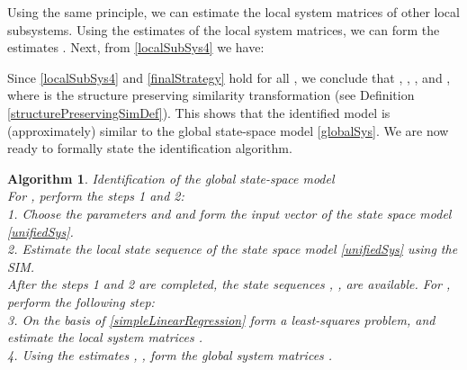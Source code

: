 \documentclass[journal,10pt]{IEEEtran}
\newtheorem{algorithm}[thm]{Algorithm}
\begin{document}
\begin{small}

\end{small}
Using the same principle, we can estimate the local system matrices of other local subsystems. Using the estimates of the local system matrices, we can form the estimates . Next, from \eqref{localSubSys4} we have:
\begin{small}

\end{small}
Since \eqref{localSubSys4} and \eqref{finalStrategy} hold for all , we conclude that , , , and ,
where  is the structure preserving similarity transformation (see Definition \ref{structurePreservingSimDef}). This shows that the identified model is (approximately) similar to the global state-space model \eqref{globalSys}. We are now ready to formally state the identification algorithm.
\\
\begin{algorithm} \textit{Identification of the global state-space model}\\
For , perform the steps 1 and 2: \\ 
1. Choose the parameters  and  and form the input vector   of the state space model \eqref{unifiedSys}.\\
 2. Estimate the local state sequence  of the state space model \eqref{unifiedSys} using the SIM.\\
After the steps 1 and 2 are completed, the state sequences , , are available. For , perform the following step:\\
  3. On the basis of \eqref{simpleLinearRegression} form a least-squares problem, and estimate the local system matrices . \\
  4. Using the estimates , , form the global system matrices .
\label{identificationAlgorithm}
\end{algorithm}
\end{document}
